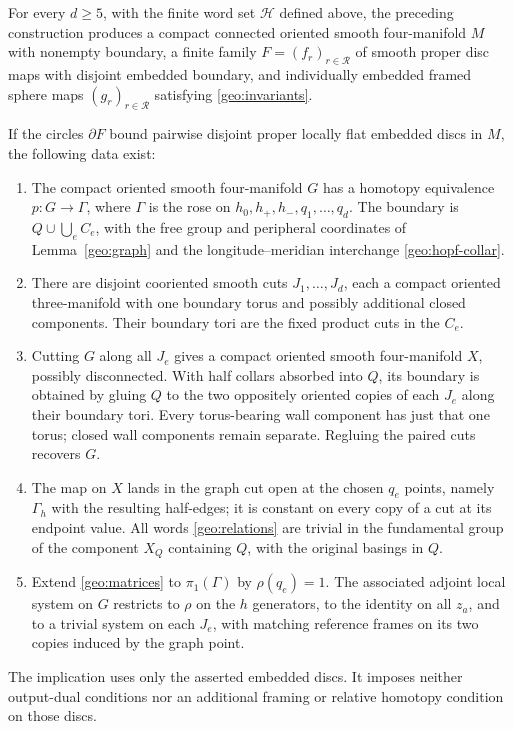 \begin{proposition}
\label{geo:construction}
For every $d\geq5$, with the finite word set $\mathcal H$ defined above,
the preceding construction produces
a compact connected oriented smooth four-manifold $M$ with
nonempty boundary, a finite family $F=(f_r)_{r\in\mathcal R}$
of smooth proper disc maps with disjoint embedded boundary,
and individually embedded framed sphere maps
$(g_r)_{r\in\mathcal R}$ satisfying \eqref{geo:invariants}.

If the circles $\partial F$ bound pairwise disjoint proper
locally flat embedded discs in $M$, the following data exist:
\begin{enumerate}
\item The compact oriented smooth four-manifold $G$ has a
homotopy equivalence $p:G\longrightarrow\Gamma$, where
$\Gamma$ is the rose on $h_0,h_+,h_-,q_1,\ldots,q_d$.
The boundary is $Q\cup\bigcup_e C_e$, with the free group
and peripheral coordinates of Lemma~\ref{geo:graph} and the
longitude--meridian interchange \eqref{geo:hopf-collar}.
\item There are disjoint cooriented smooth cuts $J_1,\ldots,J_d$,
each a compact oriented three-manifold with one boundary torus
and possibly additional closed components.  Their boundary
tori are the fixed product cuts in the $C_e$.
\item Cutting $G$ along all $J_e$ gives a compact oriented smooth
four-manifold $X$, possibly disconnected.  With half collars
absorbed into $Q$, its boundary is obtained by gluing $Q$ to
the two oppositely oriented copies of each $J_e$ along their
boundary tori.  Every torus-bearing wall component has just
that one torus; closed wall components remain separate.
Regluing the paired cuts recovers $G$.
\item The map on $X$ lands in the graph cut open at the chosen
$q_e$ points, namely $\Gamma_h$ with the resulting half-edges;
it is constant on every copy of a cut at its endpoint value.
All words \eqref{geo:relations} are trivial in the fundamental
group of the component $X_Q$ containing $Q$, with the original
basings in $Q$.
\item Extend \eqref{geo:matrices} to $\pi_1(\Gamma)$ by
$\rho(q_e)=1$.  The associated adjoint local system on $G$
restricts to $\rho$ on the $h$ generators, to the identity on
all $z_a$, and to a trivial system on each $J_e$, with matching
reference frames on its two copies induced by the graph point.
\end{enumerate}
The implication uses only the asserted embedded discs.  It imposes
neither output-dual conditions nor an additional framing or relative
homotopy condition on those discs.
\end{proposition}

